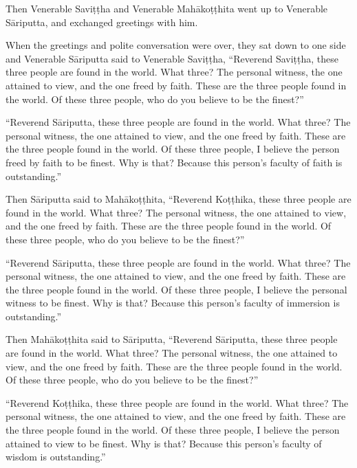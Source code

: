 \documentclass[12pt,openany]{book}%
\begin{document}
Then Venerable \textsanskrit{Saviṭṭha} and Venerable \textsanskrit{Mahākoṭṭhita} went up to Venerable \textsanskrit{Sāriputta}, and exchanged greetings with him. 

When the greetings and polite conversation were over, they sat down to one side and Venerable \textsanskrit{Sāriputta} said to Venerable \textsanskrit{Saviṭṭha}, “Reverend \textsanskrit{Saviṭṭha}, these three people are found in the world. What three? The personal witness, the one attained to view, and the one freed by faith. These are the three people found in the world. Of these three people, who do you believe to be the finest?” 

“Reverend \textsanskrit{Sāriputta}, these three people are found in the world. What three? The personal witness, the one attained to view, and the one freed by faith. These are the three people found in the world. Of these three people, I believe the person freed by faith to be finest. Why is that? Because this person’s faculty of faith is outstanding.” 

Then \textsanskrit{Sāriputta} said to \textsanskrit{Mahākoṭṭhita}, “Reverend \textsanskrit{Koṭṭhika}, these three people are found in the world. What three? The personal witness, the one attained to view, and the one freed by faith. These are the three people found in the world. Of these three people, who do you believe to be the finest?” 

“Reverend \textsanskrit{Sāriputta}, these three people are found in the world. What three? The personal witness, the one attained to view, and the one freed by faith. These are the three people found in the world. Of these three people, I believe the personal witness to be finest. Why is that? Because this person’s faculty of immersion is outstanding.” 

Then \textsanskrit{Mahākoṭṭhita} said to \textsanskrit{Sāriputta}, “Reverend \textsanskrit{Sāriputta}, these three people are found in the world. What three? The personal witness, the one attained to view, and the one freed by faith. These are the three people found in the world. Of these three people, who do you believe to be the finest?” 

“Reverend \textsanskrit{Koṭṭhika}, these three people are found in the world. What three? The personal witness, the one attained to view, and the one freed by faith. These are the three people found in the world. Of these three people, I believe the person attained to view to be finest. Why is that? Because this person’s faculty of wisdom is outstanding.” 
\end{document}
